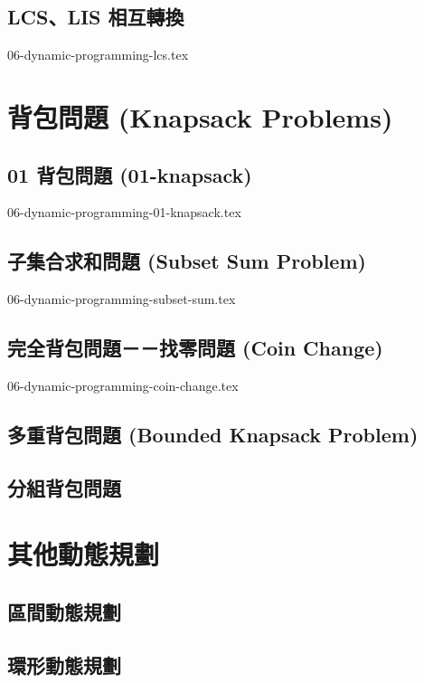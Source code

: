 \documentclass[12pt,a4paper,oneside]{report}
\begin{document}
\begin{CJK}{UTF8}{bkai}
\subsection{LCS、LIS 相互轉換}

{06-dynamic-programming-lcs.tex}

\section{背包問題 (Knapsack Problems)}

\subsection{01 背包問題 (01-knapsack)}

{06-dynamic-programming-01-knapsack.tex}

\subsection{子集合求和問題 (Subset Sum Problem)}

{06-dynamic-programming-subset-sum.tex}

\subsection{完全背包問題－－找零問題 (Coin Change)}

{06-dynamic-programming-coin-change.tex}

\subsection{多重背包問題 (Bounded Knapsack Problem)}
\subsection{分組背包問題}

\section{其他動態規劃}

\subsection{區間動態規劃}
\subsection{環形動態規劃}

\end{CJK}
\end{document}
